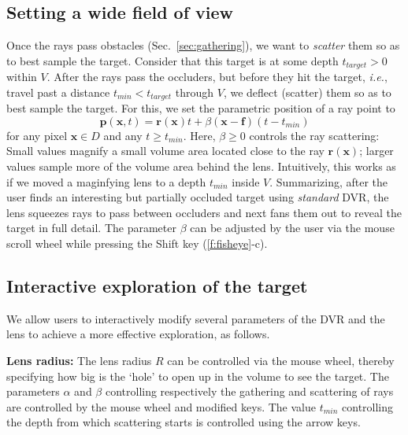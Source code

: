 \subsection{Setting a wide field of view}
\label{sec:scattering}
%
Once the rays pass obstacles (Sec.~\ref{sec:gathering}), we want to \emph{scatter} them so as to best sample the target. Consider that this target is at some depth $t_{target}>0$ within $V$. After the rays pass the occluders, but before they hit the target, \emph{i.e.}, travel past a distance $t_{min} < t_{target}$ through $V$, we deflect (scatter) them so as to best sample the target. For this, we set the parametric position of a ray point to
%
\begin{equation}
\mathbf{p}(\mathbf{x}, t) = \mathbf{r}(\mathbf{x})t + \beta (\mathbf{x}-\mathbf{f})(t-t_{min})
\label{eqn:scattering}
\end{equation}
%
for any pixel $\mathbf{x} \in D$ and any $t \geq t_{min}$. Here, $\beta \geq 0$ controls the ray scattering: Small values magnify a small volume area located close to the ray $\mathbf{r}(\mathbf{x})$; larger values sample more of the volume area behind the lens. Intuitively, this works as if we moved a maginfying lens to a depth $t_{min}$ inside $V$. Summarizing, after the user finds an interesting but partially occluded target using \emph{standard} DVR, the lens squeezes rays to pass between occluders and next fans them out to reveal the target in full detail. The parameter $\beta$ can be adjusted by the user via the mouse scroll wheel while pressing the Shift key (\autoref{f:fisheye}-c).
%
%

\vspace{-0.15cm}
\subsection{Interactive exploration of the target}
%
We allow users to interactively modify several parameters of the DVR and the lens to achieve a more effective exploration, as follows.

\vspace{0.2cm}
\noindent\textbf{Lens radius:} The lens radius $R$ can be controlled via the mouse wheel, thereby specifying how big is the `hole' to open up in the volume to see the target. The parameters $\alpha$ and $\beta$ controlling respectively the gathering and scattering of rays are controlled by the mouse wheel and modified keys. The value $t_{min}$ controlling the depth from which scattering starts is controlled using the arrow keys.

